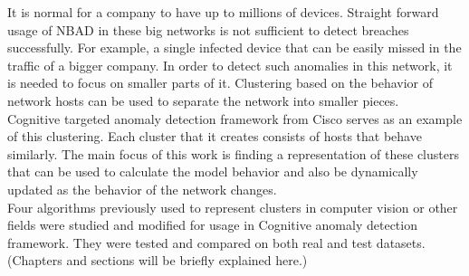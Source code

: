 \documentclass[thesis=B,english]{FITthesis}[2012/10/20]
\begin{document}
It is normal for a company to have up to millions of devices. Straight forward usage of NBAD in these big networks is not sufficient to detect breaches successfully. For example, a single infected device that can be easily missed in the traffic of a bigger company. In order to detect such anomalies in this network, it is needed to focus on smaller parts of it. Clustering based on the behavior of network hosts can be used to separate the network into smaller pieces. \\

Cognitive targeted anomaly detection framework from Cisco serves as an example of this clustering. Each cluster that it creates consists of hosts that behave similarly.  The main focus of this work is finding a representation of these clusters that can be used to calculate the model behavior and also be dynamically updated as the behavior of the network changes. \\ 
                                           
Four algorithms previously used to represent clusters in computer vision or other fields were studied and modified for usage in Cognitive anomaly detection framework. They were tested and compared on both real and test datasets. \\

(Chapters and sections will be briefly explained here.)

%                                                                                  
                                                                                    
\end{document}
